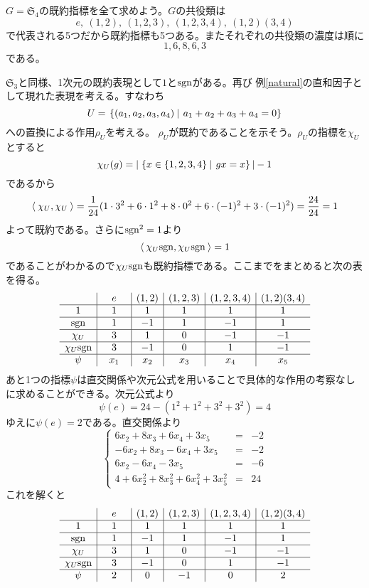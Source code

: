 \documentclass{ltjsreport}
\begin{document}
\begin{eg}
  $G=\mathfrak{S}_4$の既約指標を全て求めよう。$G$の共役類は
  \[
  e,\:(1,2),\:(1,2,3),\:(1,2,3,4),\:(1,2)(3,4)  
  \]
  で代表される5つだから既約指標も5つある。またそれぞれの共役類の濃度は順に
  \[
  1,6,8,6,3  
  \]
  である。
  
  $\mathfrak{S}_3$と同様、1次元の既約表現として$1$と$\mathrm{sgn}$がある。再び
  例\ref{natural}の直和因子として現れた表現を考える。すなわち
  \[
  U=\left.\left\{(a_1,a_2,a_3,a_4) \: \right| \: a_1+a_2+a_3+a_4=0\right\}  
  \]
  への置換による作用$\rho_U$を考える。
  $\rho_U$が既約であることを示そう。$\rho_U$の指標を$\chi_U$とすると
  \[
  \chi_U(g)=|\left.\left\{x\in\{1,2,3,4\} \: \right| \: gx=x\right\}|-1  
  \]
  であるから
  \[
  \langle\:\chi_U,\chi_U\:\rangle=\frac{1}{24}(1\cdot 3^2+6\cdot 1^2+8\cdot 0^2+6\cdot (-1)^2+3\cdot(-1)^2)=\frac{24}{24}=1 
  \]
  よって既約である。さらに$\mathrm{sgn}^2=1$より
  \[
  \langle\:\chi_U\mathrm{sgn},\chi_U\mathrm{sgn}\:\rangle=1 
  \]
  であることがわかるので$\chi_U\mathrm{sgn}$も既約指標である。ここまでをまとめると次の表を得る。
  \[
    \begin{array}{c|c|c|c|c|c}
  
           & \quad e\quad & (1,2) & (1,2,3) & (1,2,3,4) & (1,2)(3,4)\\
      \hline
      1    & 1 &   1   &    1    &     1     &      1    \\
      \hline
      \mathrm{sgn} & 1 &   -1  &    1    &     -1    &      1   \\
      \hline
      \chi_U & 3 &   1   &    0    &     -1    &      -1  \\
      \hline
      \chi_U\mathrm{sgn} & 3 & -1 &   0    &     1    &     -1  \\
      \hline
      \psi       &  x_1  & x_2 & x_3 &   x_4    &     x_5     
    \end{array}
  \]
  あと1つの指標$\psi$は直交関係や次元公式を用いることで具体的な作用の考察なしに求めることができる。次元公式より
  \[
  \psi(e)=24-(1^2+1^2+3^2+3^2)=4  
  \]
  ゆえに$\psi(e)=2$である。直交関係より
  \[
  \left\{\begin{array}{ccc}
    6x_2+8x_3+6x_4+3x_5 & = & -2\\
    -6x_2+8x_3-6x_4+3x_5 & = & -2\\
    6x_2-6x_4-3x_5 & = & -6\\
    4+6x_2^2+8x_3^2+6x_4^2+3x_5^2 &= &24
  \end{array}\right.  
  \]
  これを解くと
  \[
    \begin{array}{c|c|c|c|c|c}
  
           & \quad e\quad & (1,2) & (1,2,3) & (1,2,3,4) & (1,2)(3,4)\\
      \hline
      1    & 1 &   1   &    1    &     1     &      1    \\
      \hline
      \mathrm{sgn} & 1 &   -1  &    1    &     -1    &      1   \\
      \hline
      \chi_U & 3 &   1   &    0    &     -1    &      -1  \\
      \hline
      \chi_U\mathrm{sgn} & 3 & -1 &   0    &     1    &     -1  \\
      \hline
      \psi       &  2  & 0 & -1 &   0 &     2     
    \end{array}
  \]
\end{eg}
\end{document}

